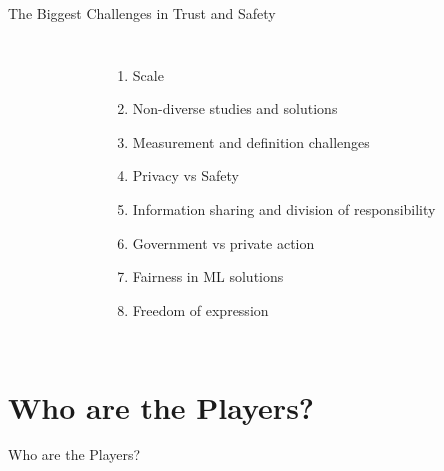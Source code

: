 \documentclass[nobackground,dvipsnames,table]{beamer}
\begin{document}
\begin{frame}{The Biggest Challenges in Trust and Safety}
\begin{columns}
\begin{figure}
                \end{figure}
                \begin{enumerate}
                    \item Scale
                    \item Non-diverse studies and solutions
                    \item Measurement and definition challenges
                    \item Privacy vs Safety
                    \item Information sharing and division of responsibility
                    \item Government vs private action
                    \item Fairness in ML solutions
                    \item Freedom of expression
                \end{enumerate}
        \end{columns}
\end{frame}


\section{Who are the Players?}

\begin{frame}{}
        \thispagestyle{empty}
        \huge
        Who are the Players?
\end{frame}
\end{document}
